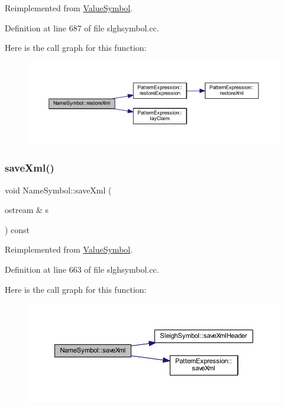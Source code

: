 Reimplemented from \mbox{\hyperlink{class_value_symbol_af9104983ea7381b608fe56b5ab8a2d7c}{Value\+Symbol}}.



Definition at line 687 of file slghsymbol.\+cc.

Here is the call graph for this function\+:
\nopagebreak
\begin{figure}[H]
\begin{center}
\leavevmode
\includegraphics[width=350pt]{class_name_symbol_a3ff5b56a8a5cfd2e009cc5c9e8a49e97_cgraph}
\end{center}
\end{figure}
\mbox{\label{class_name_symbol_a0f97f18cff09e4c67e8bb8d54c392031}} 
\subsubsection{\texorpdfstring{saveXml()}{saveXml()}}
{\footnotesize\ttfamily void Name\+Symbol\+::save\+Xml (\begin{DoxyParamCaption}\item[{ostream \&}]{s }\end{DoxyParamCaption}) const\hspace{0.3cm}{\ttfamily [virtual]}}



Reimplemented from \mbox{\hyperlink{class_value_symbol_aa7b4012d522c5864aea52486b0d47978}{Value\+Symbol}}.



Definition at line 663 of file slghsymbol.\+cc.

Here is the call graph for this function\+:
\nopagebreak
\begin{figure}[H]
\begin{center}
\leavevmode
\includegraphics[width=350pt]{class_name_symbol_a0f97f18cff09e4c67e8bb8d54c392031_cgraph}
\end{center}
\end{figure}
\mbox{\label{class_name_symbol_a6579b3f6516743c8ba34aa2e86429a14}} 
